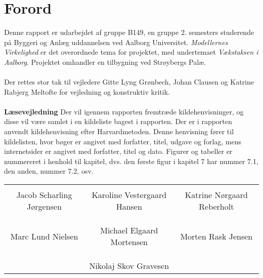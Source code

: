 \chapter*{Forord}
Denne rapport er udarbejdet af gruppe B149, en gruppe 2. semesters studerende på Byggeri og Anlæg uddannelsen ved Aalborg Universitet. \textit{Modellernes Virkelighed} er det overordnede tema for projektet, med undertemaet \textit{Vækstaksen i Aalborg}. Projektet omhandler en tilbygning ved Strøybergs Palæ.
\\
\\
Der rettes stor tak til vejledere Gitte Lyng Grønbech, Johan Clausen og Katrine Rabjerg Meltofte for vejledning og konstruktiv kritik. 
\\
\\
\textbf{Læsevejledning}
\newline
Der vil igennem rapporten fremtræde kildehenvisninger, og disse vil være samlet i en kildeliste bagest i rapporten. Der er i rapporten anvendt kildehenvisning efter Harvardmetoden. Denne henvisning fører til kildelisten, hvor bøger er angivet med forfatter, titel, udgave og forlag, mens internetsider er angivet med forfatter, titel og dato. Figurer og tabeller er nummereret i henhold til kapitel, dvs. den første figur i kapitel 7 har nummer 7.1, den anden, nummer 7.2, osv. 

\phantom{Luft}

\phantom{Luft}

\begin{table}[H]
	\centering
		\begin{tabular}{c c c}
			\underline{\phantom{mmmmmmmmmmmmmm}} & \underline{\phantom{mmmmmmmmmmmmmm}} & \underline{\phantom{mmmmmmmmmmmmmm}} \\
			Jacob Scharling Jørgensen			& Karoline Vestergaard Hansen 		& Katrine Nørgaard Reberholt 			\\
			&&\\
			&&\\
			\underline{\phantom{mmmmmmmmmmmmmm}} & \underline{\phantom{mmmmmmmmmmmmmm}} & \underline{\phantom{mmmmmmmmmmmmmm}} \\
			Marc Lund Nielsen			& Michael Elgaard Mortensen 		& Morten Rask Jensen 				\\
			&&\\
			&&\\
		& \underline{\phantom{mmmmmmmmmmmmmm}} 	&			\\														
		& Nikolaj Skov Gravesen 							& 					
		\end{tabular}
\end{table}